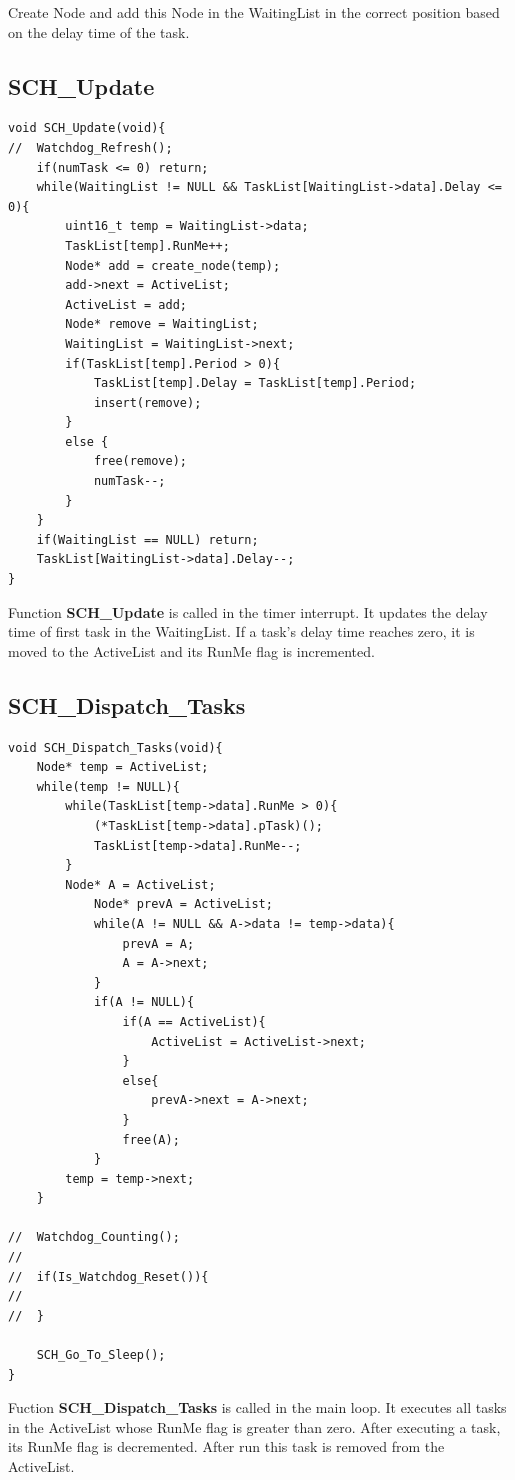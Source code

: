\documentclass[twoside, final]{hcmut_report}
\begin{document}
Create Node and add this Node in the WaitingList in the correct position based on the delay time of the task.

\subsection{SCH\_Update}
\begin{lstlisting}[basicstyle=\small, caption=An implementation of the ‘SCH\_Update’ functions]
void SCH_Update(void){
//	Watchdog_Refresh();
	if(numTask <= 0) return;
	while(WaitingList != NULL && TaskList[WaitingList->data].Delay <= 0){
		uint16_t temp = WaitingList->data;
		TaskList[temp].RunMe++;
		Node* add = create_node(temp);
		add->next = ActiveList;
		ActiveList = add;
		Node* remove = WaitingList;
		WaitingList = WaitingList->next;
		if(TaskList[temp].Period > 0){
			TaskList[temp].Delay = TaskList[temp].Period;
			insert(remove);
		}
		else {
			free(remove);
			numTask--;
		}
	}
	if(WaitingList == NULL) return;
	TaskList[WaitingList->data].Delay--;
}
\end{lstlisting}

Function \textbf{SCH\_Update} is called in the timer interrupt. It updates the delay time of first task in the WaitingList. If a task's delay time reaches zero, it is moved to the ActiveList and its RunMe flag is incremented.

\subsection{SCH\_Dispatch\_Tasks}

\begin{lstlisting}[basicstyle=\small, caption=An implementation of the ‘SCH\_Dispatch\_Tasks’ functions]
void SCH_Dispatch_Tasks(void){
	Node* temp = ActiveList;
	while(temp != NULL){
		while(TaskList[temp->data].RunMe > 0){
			(*TaskList[temp->data].pTask)();
			TaskList[temp->data].RunMe--;
		}
		Node* A = ActiveList;
			Node* prevA = ActiveList;
			while(A != NULL && A->data != temp->data){
				prevA = A;
				A = A->next;
			}
			if(A != NULL){
				if(A == ActiveList){
					ActiveList = ActiveList->next;
				}
				else{
					prevA->next = A->next;
				}
				free(A);
			}
		temp = temp->next;
	}

//	Watchdog_Counting();
//
//	if(Is_Watchdog_Reset()){
//
//	}

	SCH_Go_To_Sleep();
}
\end{lstlisting}

Fuction \textbf{SCH\_Dispatch\_Tasks} is called in the main loop. It executes all tasks in the ActiveList whose RunMe flag is greater than zero. After executing a task, its RunMe flag is decremented. After run this task is removed from the ActiveList.
\end{document}
